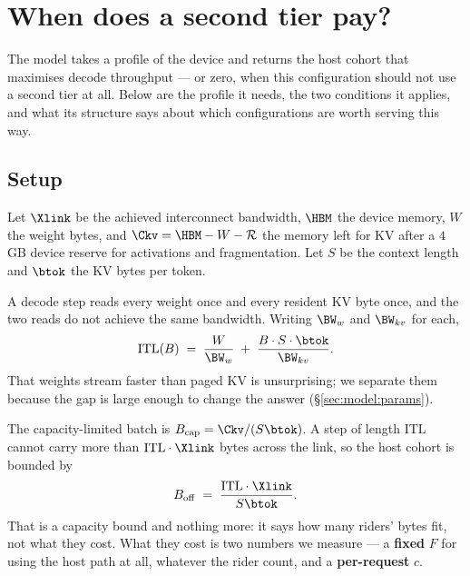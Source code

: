 %

\section{When does a second tier pay?}
\label{sec:model}

The model takes a profile of the device and returns the host cohort that maximises
decode throughput --- or zero, when this configuration should not use a second tier
at all. Below are the profile it needs, the two conditions it applies, and what its
structure says about which configurations are worth serving this way.

\subsection{Setup}

Let $\Xlink$ be the achieved interconnect bandwidth, $\HBM$ the device memory, $W$
the weight bytes, and $\Ckv = \HBM - W - \mathcal{R}$ the memory left for KV after a
$4$\,GB device reserve for activations and fragmentation. Let $S$ be the context
length and $\btok$ the KV bytes per token.

A decode step reads every weight once and every resident KV byte once, and the two
reads do not achieve the same bandwidth. Writing $\BW_w$ and $\BW_{kv}$ for each,
%
\begin{equation}
\label{eq:step}
\mathrm{ITL}(B) \;=\; \frac{W}{\BW_w} \;+\; \frac{B \cdot S \cdot \btok}{\BW_{kv}}.
\end{equation}
%
That weights stream faster than paged KV is unsurprising; we separate them
because the gap is large enough to change the answer (\S\ref{sec:model:params}).

The capacity-limited batch is $B_{\mathrm{cap}} = \Ckv/(S\btok)$. A step of length
$\mathrm{ITL}$ cannot carry more than $\mathrm{ITL}\cdot\Xlink$ bytes across the
link, so the host cohort is bounded by
%
\begin{equation}
\label{eq:boff}
B_{\mathrm{off}} \;=\; \frac{\mathrm{ITL} \cdot \Xlink}{S \btok}.
\end{equation}
%
That is a capacity bound and nothing more: it says how many riders' bytes fit, not
what they cost. What they cost is two numbers we measure --- a \textbf{fixed} $F$
for using the host path at all, whatever the rider count, and a
\textbf{per-request} $c$.

